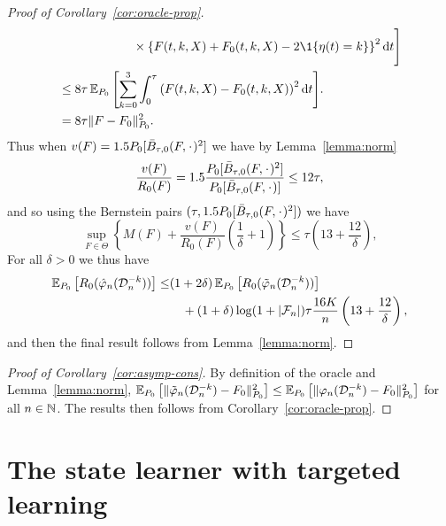 \documentclass[a4,danish]{article}
\newcommand{\data}{\ensuremath{\mathcal{D}}}
\begin{document}
\begin{proof}[Proof of Corollary~\ref{cor:oracle-prop}]
\begin{align*}
  & \quad \quad \quad\quad \quad \quad \times
    \left\{
    F(t, k, X) +  F_0(t, k, X)-2 \1{\{\eta(t) = k\}}
    \right\}^2
    \diff t 
    \Bigg]
  \\
  & \leq
    8\tau \E_{P_0}{\left[
    \sum_{k=0}^{3} \int_0^{\tau}
    \left(
    F(t, k, X) - F_0(t, k, X)
    \right)^2
    \diff t 
    \right]}.
  \\
  & =
    8\tau \Vert F - F_0 \Vert_{P_0}^2.
\end{align*}
Thus when \( v(F) = 1.5 P_0{[\bar{B}_{\tau,0}(F, \blank)^2]} \) we have by
Lemma~\ref{lemma:norm}
\begin{equation*}
  \frac{v(F)}{R_0(F)}
  = 1.5 \frac{P_0{[\bar{B}_{\tau,0}(F, \blank)^2]}}{P_0{[\bar{B}_{\tau,0}(F, \blank)]}}
  \leq 12 \tau,
\end{equation*}
and so using the Bernstein pairs \( (\tau, 1.5 P_0{[\bar{B}_{\tau,0}(F, \blank)^2]}) \) we have
\begin{equation*}
  \sup_{F \in \Theta}
  \left\{
    M(F) + \frac{v(F)}{R_0(F)}
    \left(
      \frac{1}{\delta} + 1
    \right)
  \right\}
  \leq \tau
  \left(
    13 + \frac{12}{\delta}
  \right),
\end{equation*}
For all $\delta>0$ we thus have
\begin{align*}
  \E_{P_0}{\left[ R_0(\hat{\phi}_n(\data_n^{-k})) \right]}
  \leq
  &(1+2\delta)\E_{P_0}{\left[ R_0(\tilde{\phi}_n(\data_n^{-k})) \right]}
  \\
  & \quad
    + (1+\delta)\log(1 + |\mathcal{F}_n|) \tau \frac{16 K}{n}
    \left(
    13 + \frac{12}{\delta}
    \right),
\end{align*}
and then the final result follows from Lemma~\ref{lemma:norm}.
\end{proof}

\begin{proof}[Proof of Corollary~\ref{cor:asymp-cons}]
  By definition of the oracle and Lemma~\ref{lemma:norm},
  \( \E_{P_0}{\left[ \Vert \tilde{\phi}_n(\data_n^{-k}) - F_0 \Vert_{P_0}^2 \right]}
  \leq \E_{P_0}{\left[ \Vert \phi_n(\data_n^{-k}) - F_0 \Vert_{P_0}^2 \right]} \) for
  all \( n \in \mathbb{N} \). The results then follows from
  Corollary~\ref{cor:oracle-prop}.
\end{proof}

\section{The state learner with targeted learning}
\label{sec:state-learner-with}
\end{document}

